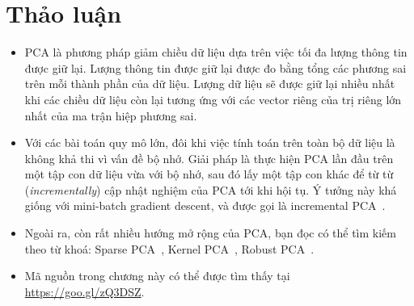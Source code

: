 \section{Thảo luận}
\begin{itemize}
\item PCA là phương pháp giảm chiều dữ liệu dựa trên việc tối đa lượng
thông tin được giữ lại. Lượng thông tin được giữ lại được đo bằng tổng các
phương sai trên mỗi thành phần của dữ liệu. Lượng dữ liệu sẽ được giữ lại nhiều
nhất khi các chiều dữ liệu còn lại tương ứng với các vector riêng của trị riêng
lớn nhất của ma trận hiệp phương sai.

\item Với các bài toán quy mô lớn, đôi khi việc tính toán trên toàn bộ dữ liệu
là không khả thi vì vấn đề bộ nhớ. Giải pháp là thực hiện PCA lần đầu
trên một tập con dữ liệu vừa với bộ nhớ, sau đó lấy một tập con khác để {từ từ} (\textit{incrementally}) cập nhật nghiệm của PCA tới khi hội
tụ. Ý tưởng này khá giống với mini-batch gradient descent, và được gọi là
incremental PCA~\cite{zhao2006novel}.

\item Ngoài ra, còn rất nhiều hướng mở rộng của PCA, bạn đọc có thể tìm kiếm
theo từ khoá: Sparse PCA~\cite{d2005direct}, Kernel PCA~\cite{mika1999kernel},
Robust PCA~\cite{candes2011robust}.

\item Mã nguồn trong chương này có thể được tìm thấy tại
\url{https://goo.gl/zQ3DSZ}.
\end{itemize}

